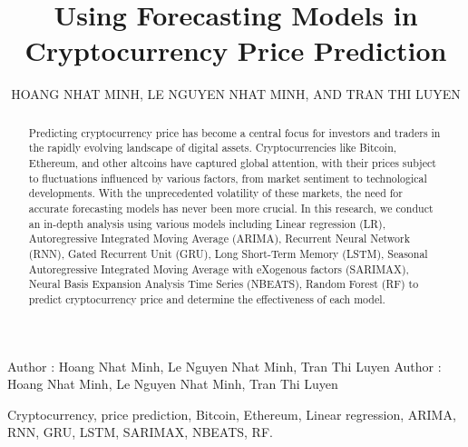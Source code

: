 \documentclass{ieeeojies}
\begin{document}
\title{Using Forecasting Models in Cryptocurrency Price Prediction}

\author{\uppercase{Hoang Nhat Minh},
\uppercase{Le Nguyen Nhat Minh, and Tran Thi Luyen}}

\address[1]{Faculty of Information Systems, University of Information Technology, (e-mail: 21522336@gm.uit.edu.vn)}
\address[2]{Faculty of Information Systems, University of Information Technology, (e-mail: 21522338@gm.uit.edu.vn)}
\address[3]{Faculty of Information Systems, University of Information Technology, (e-mail: 21521107@gm.uit.edu.vn)}

\markboth
{Author \headeretal: Hoang Nhat Minh, Le Nguyen Nhat Minh, Tran Thi Luyen}
{Author \headeretal: Hoang Nhat Minh, Le Nguyen Nhat Minh, Tran Thi Luyen}

\begin{abstract}
Predicting cryptocurrency price has become a central focus for investors and traders in the rapidly evolving landscape of digital assets. Cryptocurrencies like Bitcoin, Ethereum, and other altcoins have captured global attention, with their prices subject to fluctuations influenced by various factors, from market sentiment to technological developments. With the unprecedented volatility of these markets, the need for accurate forecasting models has never been more crucial. In this research, we conduct an in-depth analysis using various models including Linear regression (LR), Autoregressive Integrated Moving Average (ARIMA), Recurrent Neural Network (RNN), Gated Recurrent Unit (GRU), Long Short-Term Memory (LSTM), Seasonal Autoregressive Integrated Moving Average with eXogenous factors (SARIMAX), Neural Basis Expansion Analysis Time Series (NBEATS), Random Forest (RF) to predict cryptocurrency price and determine the effectiveness of each model.
\end{abstract}

\begin{keywords}
Cryptocurrency, price prediction, Bitcoin, Ethereum, Linear regression, ARIMA, RNN, GRU, LSTM, SARIMAX, NBEATS, RF.
\end{keywords}

\titlepgskip=-15pt

\maketitle
\end{document}

